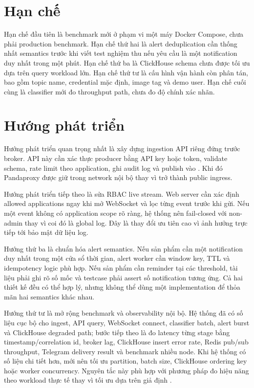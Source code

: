 \section{Hạn chế}

Hạn chế đầu tiên là benchmark mới ở phạm vi một máy Docker Compose, chưa phải production benchmark. Hạn chế thứ hai là alert deduplication cần thống nhất semantics trước khi viết test nghiệm thu nếu yêu cầu là một notification duy nhất trong một phút. Hạn chế thứ ba là ClickHouse schema chưa được tối ưu dựa trên query workload lớn. Hạn chế thứ tư là cấu hình vận hành còn phân tán, bao gồm topic name, credential mặc định, image tag và demo user. Hạn chế cuối cùng là classifier mới đo throughput path, chưa đo độ chính xác nhãn.

\section{Hướng phát triển}

Hướng phát triển quan trọng nhất là xây dựng ingestion API riêng đứng trước broker. API này cần xác thực producer bằng API key hoặc token, validate schema, rate limit theo application, ghi audit log và publish vào . Khi đó Pandaproxy được giữ trong network nội bộ thay vì trở thành public ingress.

Hướng phát triển tiếp theo là sửa RBAC live stream. Web server cần xác định allowed applications ngay khi mở WebSocket và lọc từng event trước khi gửi. Nếu một event không có application scope rõ ràng, hệ thống nên fail-closed với non-admin thay vì coi đó là global log. Đây là thay đổi ưu tiên cao vì ảnh hưởng trực tiếp tới bảo mật dữ liệu log.

Hướng thứ ba là chuẩn hóa alert semantics. Nếu sản phẩm cần một notification duy nhất trong một cửa sổ thời gian, alert worker cần window key, TTL và idempotency logic phù hợp. Nếu sản phẩm cần reminder tại các threshold, tài liệu phải ghi rõ số mốc và testcase phải assert số notification tương ứng. Cả hai thiết kế đều có thể hợp lý, nhưng không thể dùng một implementation để thỏa mãn hai semantics khác nhau.

Hướng thứ tư là mở rộng benchmark và observability nội bộ. Hệ thống đã có số liệu cục bộ cho ingest, API query, WebSocket connect, classifier batch, alert burst và ClickHouse degraded path; bước tiếp theo là đo latency từng stage bằng timestamp/correlation id, broker lag, ClickHouse insert error rate, Redis pub/sub throughput, Telegram delivery result và benchmark nhiều node. Khi hệ thống có số liệu chi tiết hơn, mới nên tối ưu partition, batch size, ClickHouse ordering key hoặc worker concurrency. Nguyên tắc này phù hợp với phương pháp đo hiệu năng theo workload thực tế thay vì tối ưu dựa trên giả định \cite{greggUSE,barrosoTail}.

